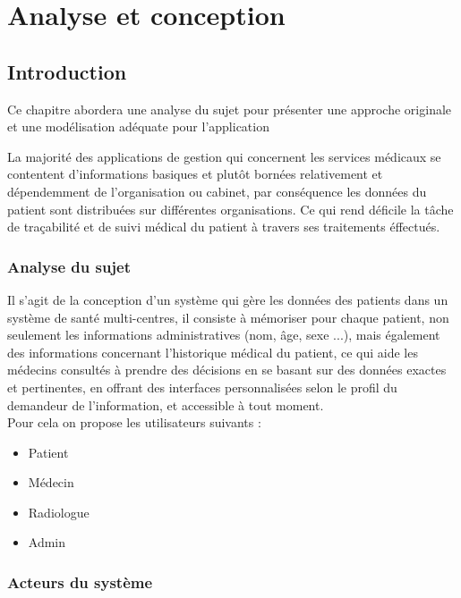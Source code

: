 \chapter{Analyse et conception}



\section{Introduction}

Ce chapitre abordera une analyse du sujet pour présenter une approche originale et une modélisation adéquate pour l’application

La majorité des applications de gestion qui concernent les services médicaux
se contentent d’informations basiques et plutôt bornées relativement et dépendemment de
l’organisation ou cabinet, par conséquence les données du patient sont distribuées sur
différentes organisations. Ce qui rend déficile la tâche de traçabilité et de suivi médical du patient à travers ses traitements éffectués.

\subsection{Analyse du sujet}

Il s’agit de la conception d’un système qui gère les données des patients dans un système de santé multi-centres, il consiste à mémoriser pour chaque patient, non seulement les informations administratives (nom, âge, sexe ...), mais également des informations concernant l’historique médical du patient, ce qui aide les médecins consultés à prendre des décisions en se basant sur des données exactes et pertinentes, en offrant des interfaces personnalisées selon le profil du demandeur de l’information, et accessible à tout moment.\\
Pour cela on propose les utilisateurs suivants : 

\begin{itemize}
\item Patient
\item Médecin
\item Radiologue
\item Admin
\end{itemize}


\subsection{Acteurs du système}
 

